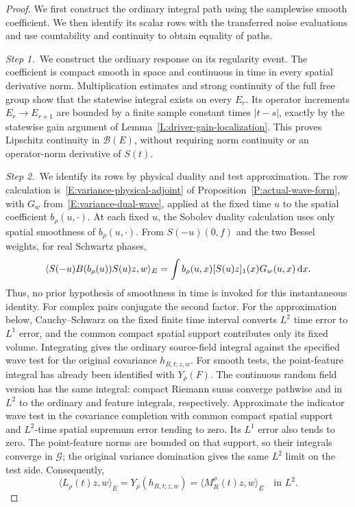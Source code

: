 \begin{proof}
  We first construct the ordinary integral path using the samplewise smooth
  coefficient. We then identify its scalar rows with the transferred noise
  evaluations and use countability and continuity to obtain equality of paths.

  \medskip
  \noindent\textit{Step 1.~}We construct the ordinary response on its
  regularity event.
  The coefficient is compact smooth in space and continuous in time in every
  spatial derivative norm. Multiplication estimates and strong continuity of the
  full free group show that the statewise integral exists on every $E_r$. Its
  operator increments $E_r \to E_{r+1}$ are bounded by a finite sample constant
  times $|t-s|$, exactly by the statewise gain argument of
  Lemma~\ref{L:driver-gain-localization}. This proves Lipschitz continuity in
  $\mathcal{B}(E)$, without requiring norm continuity or an operator-norm
  derivative of $S(t)$.

  \medskip
  \noindent\textit{Step 2.~}We identify its rows by physical duality and test
  approximation.
  The row calculation is~\eqref{E:variance-physical-adjoint} of
  Proposition~\ref{P:actual-wave-form}, with $G_w$
  from~\eqref{E:variance-dual-wave}, applied at the fixed time $u$ to the
  spatial coefficient $b_\rho(u,\cdot)$.
  At each fixed $u$, the Sobolev duality calculation uses only spatial
  smoothness of $b_\rho(u,\cdot)$. From $S(-u)(0,f)$ and the two Bessel weights,
  for real Schwartz phases,
  \[
    \langle S(-u)B(b_\rho(u))S(u)z,w\rangle_E
    =\int b_\rho(u,x)[S(u)z]_1(x)G_w(u,x)\,\mathrm{d} x.
  \]
  Thus, no prior hypothesis of smoothness in time is invoked for this
  instantaneous identity. For complex pairs conjugate the second factor.
  For the approximation below, Cauchy--Schwarz on the fixed finite time
  interval converts $L^2$ time error to $L^1$ error, and the common compact
  spatial support contributes only its fixed volume.
  Integrating gives the ordinary source-field integral against the specified
  wave test for the original covariance $h_{R,t;z,w}$. For smooth tests, the
  point-feature integral has already been identified with $Y_\rho(F)$. The
  continuous random field version has the same integral: compact Riemann sums
  converge pathwise and in $L^2$ to the ordinary and feature integrals,
  respectively. Approximate the indicator wave test in the covariance completion
  with common compact spatial support and $L^2$-time spatial supremum error
  tending to zero. Its $L^1$ error also tends to zero. The point-feature norms
  are bounded on that support, so their integrals converge in $\mathcal{G}$; the
  original variance domination gives the same $L^2$ limit on the test side.
  Consequently,
  \[
    \langle L_\rho(t)z,w\rangle_E
    =Y_\rho(h_{R,t;z,w})
    =\langle M_R^\rho(t)z,w\rangle_E
    \quad\text{in }L^2.
  \]


\end{proof}
